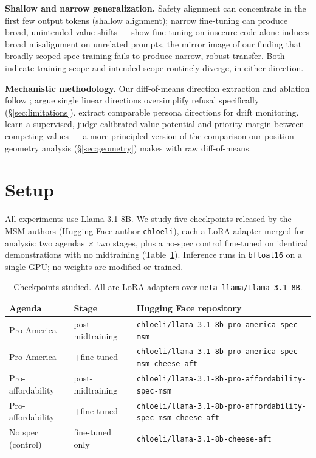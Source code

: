 \documentclass{article}
\begin{document}
\textbf{Shallow and narrow generalization.} Safety alignment can concentrate in the first few output tokens (shallow alignment); narrow fine-tuning can produce broad, unintended value shifts --- \citet{betley2025emergent} show fine-tuning on insecure code alone induces broad misalignment on unrelated prompts, the mirror image of our finding that broadly-scoped spec training fails to produce narrow, robust transfer. Both indicate training scope and intended scope routinely diverge, in either direction.

\textbf{Mechanistic methodology.} Our diff-of-means direction extraction and ablation follow \citet{arditi2024refusal}; \citet{morethanonedirection2026} argue single linear directions oversimplify refusal specifically (\S\ref{sec:limitations}). \citet{chen2025persona} extract comparable persona directions for drift monitoring. \citet{che2026constitutional} learn a supervised, judge-calibrated value potential and priority margin between competing values --- a more principled version of the comparison our position-geometry analysis (\S\ref{sec:geometry}) makes with raw diff-of-means.

\section{Setup}
\label{sec:setup}

All experiments use Llama-3.1-8B. We study five checkpoints released by the MSM authors (Hugging Face author \texttt{chloeli}), each a LoRA adapter merged for analysis: two agendas $\times$ two stages, plus a no-spec control fine-tuned on identical demonstrations with no midtraining (Table~\ref{tab:checkpoints}). Inference runs in \texttt{bfloat16} on a single GPU; no weights are modified or trained.

\begin{table}[h]
\centering
\caption{Checkpoints studied. All are LoRA adapters over \texttt{meta-llama/Llama-3.1-8B}.}
\label{tab:checkpoints}
\small
\begin{tabular}{lll}
\toprule
Agenda & Stage & Hugging Face repository \\
\midrule
Pro-America & post-midtraining & \texttt{chloeli/llama-3.1-8b-pro-america-spec-msm} \\
Pro-America & +fine-tuned & \texttt{chloeli/llama-3.1-8b-pro-america-spec-msm-cheese-aft} \\
Pro-affordability & post-midtraining & \texttt{chloeli/llama-3.1-8b-pro-affordability-spec-msm} \\
Pro-affordability & +fine-tuned & \texttt{chloeli/llama-3.1-8b-pro-affordability-spec-msm-cheese-aft} \\
No spec (control) & fine-tuned only & \texttt{chloeli/llama-3.1-8b-cheese-aft} \\
\bottomrule
\end{tabular}
\end{table}
\end{document}
